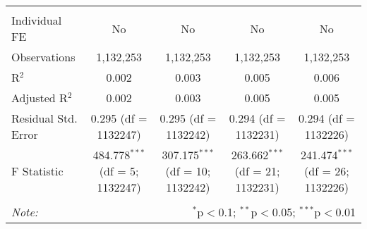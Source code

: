 \documentclass[
]{article}
\begin{document}
\begin{table}[!htbp]
{\begin{tabular}{@{\extracolsep{5pt}}lcccc}
  & & & & \\ 
\hline \\[-1.8ex] 
Individual FE & No & No & No & No \\ 
Observations & 1,132,253 & 1,132,253 & 1,132,253 & 1,132,253 \\ 
R$^{2}$ & 0.002 & 0.003 & 0.005 & 0.006 \\ 
Adjusted R$^{2}$ & 0.002 & 0.003 & 0.005 & 0.005 \\ 
Residual Std. Error & 0.295 (df = 1132247) & 0.295 (df = 1132242) & 0.294 (df = 1132231) & 0.294 (df = 1132226) \\ 
F Statistic & 484.778$^{***}$ (df = 5; 1132247) & 307.175$^{***}$ (df = 10; 1132242) & 263.662$^{***}$ (df = 21; 1132231) & 241.474$^{***}$ (df = 26; 1132226) \\ 
\hline 
\hline \\[-1.8ex] 
\textit{Note:}  & \multicolumn{4}{r}{$^{*}$p$<$0.1; $^{**}$p$<$0.05; $^{***}$p$<$0.01} \\ 
\end{tabular}
} 
\end{table} 
\newpage
\end{document}
